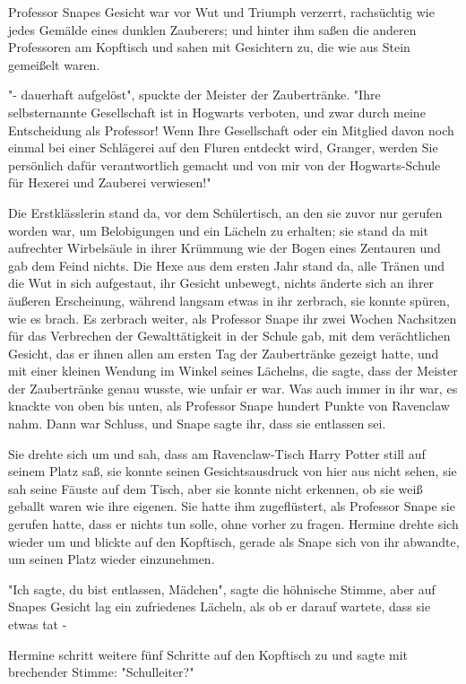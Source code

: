 {Professor Snapes Gesicht war vor Wut und Triumph verzerrt, rachsüchtig wie jedes Gemälde eines dunklen Zauberers; und hinter ihm saßen die anderen Professoren am Kopftisch und sahen mit Gesichtern zu, die wie aus Stein gemeißelt waren.

"- dauerhaft aufgelöst", spuckte der Meister der Zaubertränke. "Ihre selbsternannte Gesellschaft ist in Hogwarts verboten, und zwar durch meine Entscheidung als Professor! Wenn Ihre Gesellschaft oder ein Mitglied davon noch einmal bei einer Schlägerei auf den Fluren entdeckt wird, Granger, werden Sie persönlich dafür verantwortlich gemacht und von mir von der Hogwarts-Schule für Hexerei und Zauberei verwiesen!"

Die Erstklässlerin stand da, vor dem Schülertisch, an den sie zuvor nur gerufen worden war, um Belobigungen und ein Lächeln zu erhalten; sie stand da mit aufrechter Wirbelsäule in ihrer Krümmung wie der Bogen eines Zentauren und gab dem Feind nichts. Die Hexe aus dem ersten Jahr stand da, alle Tränen und die Wut in sich aufgestaut, ihr Gesicht unbewegt, nichts änderte sich an ihrer äußeren Erscheinung, während langsam etwas in ihr zerbrach, sie konnte spüren, wie es brach. Es zerbrach weiter, als Professor Snape ihr zwei Wochen Nachsitzen für das Verbrechen der Gewalttätigkeit in der Schule gab, mit dem verächtlichen Gesicht, das er ihnen allen am ersten Tag der Zaubertränke gezeigt hatte, und mit einer kleinen Wendung im Winkel seines Lächelns, die sagte, dass der Meister der Zaubertränke genau wusste, wie unfair er war. Was auch immer in ihr war, es knackte von oben bis unten, als Professor Snape hundert Punkte von Ravenclaw nahm. Dann war Schluss, und Snape sagte ihr, dass sie entlassen sei.

Sie drehte sich um und sah, dass am Ravenclaw-Tisch Harry Potter still auf seinem Platz saß, sie konnte seinen Gesichtsausdruck von hier aus nicht sehen, sie sah seine Fäuste auf dem Tisch, aber sie konnte nicht erkennen, ob sie weiß geballt waren wie ihre eigenen. Sie hatte ihm zugeflüstert, als Professor Snape sie gerufen hatte, dass er nichts tun solle, ohne vorher zu fragen. Hermine drehte sich wieder um und blickte auf den Kopftisch, gerade als Snape sich von ihr abwandte, um seinen Platz wieder einzunehmen.

"Ich sagte, du bist entlassen, Mädchen", sagte die höhnische Stimme, aber auf Snapes Gesicht lag ein zufriedenes Lächeln, als ob er darauf wartete, dass sie etwas tat -

Hermine schritt weitere fünf Schritte auf den Kopftisch zu und sagte mit brechender Stimme: "Schulleiter?"

}
